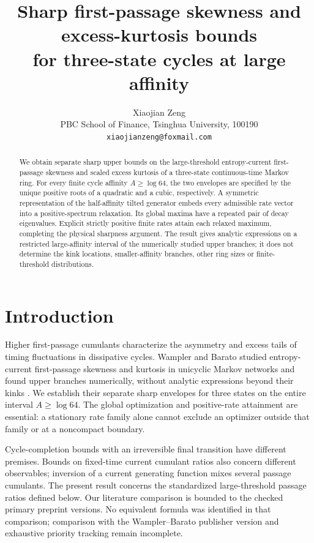 \documentclass[11pt,a4paper]{article}
\title{Sharp first-passage skewness and excess-kurtosis bounds\protect\\for three-state cycles at large affinity}
\author{Xiaojian Zeng\protect\\\small PBC School of Finance, Tsinghua University, 100190\protect\\\small\texttt{xiaojianzeng@foxmail.com}}
\date{}
\begin{document}
\maketitle
\begin{abstract}
We obtain separate sharp upper bounds on the large-threshold entropy-current first-passage skewness and scaled excess kurtosis of a three-state continuous-time Markov ring. For every finite cycle affinity $A\geq\log64$, the two envelopes are specified by the unique positive roots of a quadratic and a cubic, respectively. A symmetric representation of the half-affinity tilted generator embeds every admissible rate vector into a positive-spectrum relaxation. Its global maxima have a repeated pair of decay eigenvalues. Explicit strictly positive finite rates attain each relaxed maximum, completing the physical sharpness argument. The result gives analytic expressions on a restricted large-affinity interval of the numerically studied upper branches; it does not determine the kink locations, smaller-affinity branches, other ring sizes or finite-threshold distributions.
\end{abstract}

\section{Introduction}
Higher first-passage cumulants characterize the asymmetry and excess tails of timing fluctuations in dissipative cycles. Wampler and Barato studied entropy-current first-passage skewness and kurtosis in unicyclic Markov networks and found upper branches numerically, without analytic expressions beyond their kinks \cite{Wampler2021}. We establish their separate sharp envelopes for three states on the entire interval $A\geq\log64$. The global optimization and positive-rate attainment are essential: a stationary rate family alone cannot exclude an optimizer outside that family or at a noncompact boundary.

Cycle-completion bounds with an irreversible final transition \cite{Barato2015} have different premises. Bounds on fixed-time current cumulant ratios \cite{Ptaszynski2022} also concern different observables; inversion of a current generating function mixes several passage cumulants. The present result concerns the standardized large-threshold passage ratios defined below. Our literature comparison is bounded to the checked primary preprint versions. No equivalent formula was identified in that comparison; comparison with the Wampler--Barato publisher version and exhaustive priority tracking remain incomplete.
\end{document}
